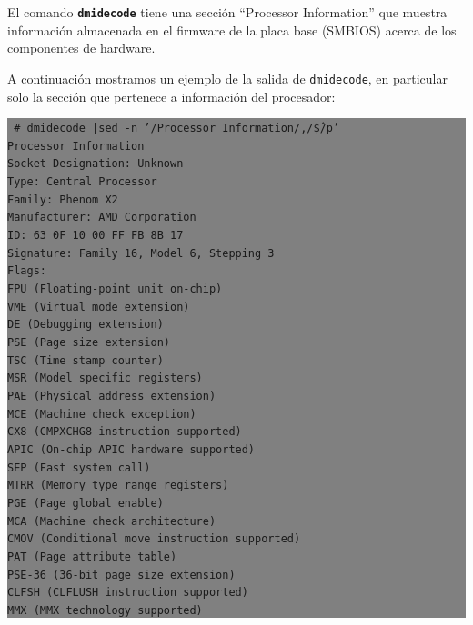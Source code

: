 \documentclass[12pt]{article}
\begin{document}
El comando \textbf{\texttt{dmidecode}} tiene una sección ``Processor Information'' que muestra
información almacenada en el firmware de la placa base (SMBIOS) acerca de los componentes de 
hardware. 

A continuación mostramos un ejemplo de la salida de \texttt{dmidecode}, en particular 
solo la sección que pertenece a información del procesador:

\colorbox{grey}{\parbox[t]{0.95\linewidth}{ \vspace*{0.5cm} { 
{\tt
\# dmidecode |sed -n '/Processor Information/,/\^\$/p'\\
Processor Information\\
	Socket Designation: Unknown\\
	Type: Central Processor\\
	Family: Phenom X2\\
	Manufacturer: AMD Corporation\\
	ID: 63 0F 10 00 FF FB 8B 17\\
	Signature: Family 16, Model 6, Stepping 3\\
	Flags:\\
		FPU (Floating-point unit on-chip)\\
		VME (Virtual mode extension)\\
		DE (Debugging extension)\\
		PSE (Page size extension)\\
		TSC (Time stamp counter)\\
		MSR (Model specific registers)\\
		PAE (Physical address extension)\\
		MCE (Machine check exception)\\
		CX8 (CMPXCHG8 instruction supported)\\
		APIC (On-chip APIC hardware supported)\\
		SEP (Fast system call)\\
		MTRR (Memory type range registers)\\
		PGE (Page global enable)\\
		MCA (Machine check architecture)\\
		CMOV (Conditional move instruction supported)\\
		PAT (Page attribute table)\\
		PSE-36 (36-bit page size extension)\\
		CLFSH (CLFLUSH instruction supported)\\
		MMX (MMX technology supported)\\
}}}}
\end{document}
